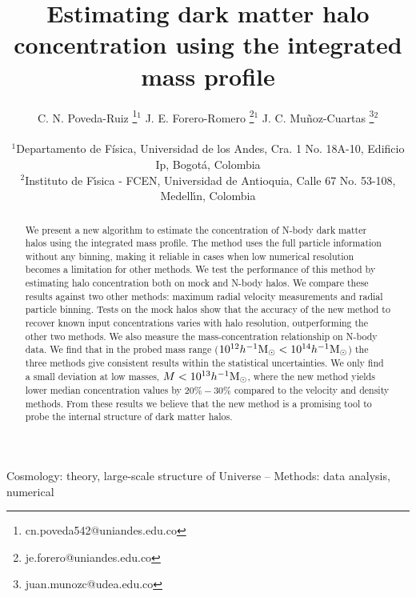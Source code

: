 \documentclass[a4,useAMS,usenatbib,usegraphicx]{mn2e}
\newcommand{\hMsun}{{\ifmmode{h^{-1}{\rm {M_{\odot}}}}\else{$h^{-1}{\rm{M_{\odot}}}$}\fi}}
\begin{document}
\title[Halo concentration via the integrated mass profile]{Estimating dark matter  halo concentration using the integrated mass profile} 
\author[C.N. Poveda-Ruiz, J.E. Forero-Romero, J.C. Mu\~noz-Cuartas]{
\parbox[t]{\textwidth}{\raggedright 
  C. N. Poveda-Ruiz \thanks{cn.poveda542@uniandes.edu.co}$^{1}$
  J. E. Forero-Romero \thanks{je.forero@uniandes.edu.co}$^{1}$
  J. C. Mu\~noz-Cuartas \thanks{juan.munozc@udea.edu.co}$^{2}$
}
\vspace*{6pt}\\
$^1$Departamento de F\'{i}sica, Universidad de los Andes, Cra. 1
No. 18A-10, Edificio Ip, Bogot\'a, Colombia\\
$^2$Instituto de F\'{\i}sica - FCEN, Universidad de Antioquia, Calle
67 No. 53-108, Medell\'{\i}n, Colombia
}

\maketitle

\begin{abstract}
We present a new algorithm to estimate the concentration of N-body
dark matter halos using the integrated mass profile.
The method uses the full particle information without any binning,
making it reliable in cases when low numerical resolution becomes a
limitation for other methods.   
We test the performance of this method by estimating halo
concentration both on mock and N-body halos. 
We compare these results against two other methods:
maximum radial velocity measurements and radial particle binning.
Tests on the mock halos show that the accuracy of the new method to
recover known input concentrations varies with halo resolution,
outperforming the other two methods. 
We also measure the mass-concentration relationship on N-body
data. 
We find that in the probed mass range ($10^{12}\hMsun <
10^{14}\hMsun$) the three methods give consistent results within the
statistical uncertainties.   
We only find a small deviation at low masses, $M<10^{13}\hMsun$, where
the new method yields lower median concentration values by $20\%-30\%$
compared to the velocity and density methods. 
From these results we believe that the new method is a promising tool
to probe the internal structure of dark matter halos.
\end{abstract}

\begin{keywords}
Cosmology: theory, large-scale structure of Universe --
Methods: data analysis, numerical 
\end{keywords}
\end{document}
